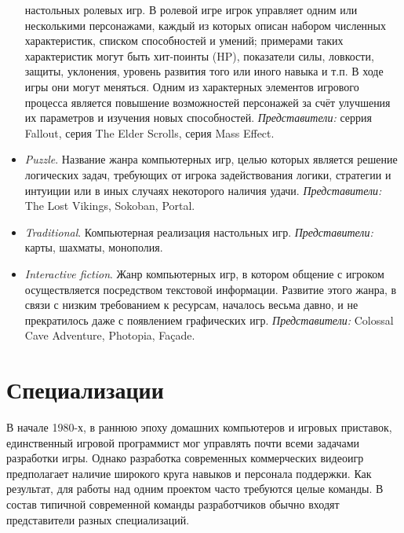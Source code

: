 \begin{itemize}
        настольных ролевых игр. В ролевой игре игрок управляет одним или несколькими персонажами, каждый 
        из которых описан набором численных характеристик, списком способностей и умений; примерами таких 
        характеристик могут быть хит-поинты (HP), показатели силы, ловкости, защиты, уклонения, уровень 
        развития того или иного навыка и т.п. В ходе игры они могут меняться. Одним из характерных элементов 
        игрового процесса является повышение возможностей персонажей за счёт улучшения их параметров и 
        изучения новых способностей. \emph{Представители:} серрия Fallout, серия The Elder Scrolls, 
        серия Mass Effect.
    \item \emph{Puzzle}. Название жанра компьютерных игр, целью которых является решение логических задач, 
        требующих от игрока задействования логики, стратегии и интуиции или в иных случаях некоторого 
        наличия удачи. \emph{Представители:} The Lost Vikings, Sokoban, Portal.
    \item \emph{Traditional}. Компьютерная реализация настольных игр. \emph{Представители:} карты, шахматы, 
        монополия.
    \item \emph{Interactive fiction}. Жанр компьютерных игр, в котором общение с игроком осуществляется 
        посредством текстовой информации. Развитие этого жанра, в связи с низким требованием к ресурсам, 
        началось весьма давно, и не прекратилось даже с появлением графических игр. 
        \emph{Представители:} Colossal Cave Adventure, Photopia, Façade.
\end{itemize}

\chapter{Специализации}
В начале 1980-х, в раннюю эпоху домашних компьютеров и игровых приставок, единственный игровой программист
мог управлять почти всеми задачами разработки игры. Однако разработка современных коммерческих видеоигр
предполагает наличие широкого круга навыков и персонала поддержки. Как результат, для работы над одним
проектом часто требуются целые команды. В состав типичной современной команды разработчиков обычно входят
представители разных специализаций.

